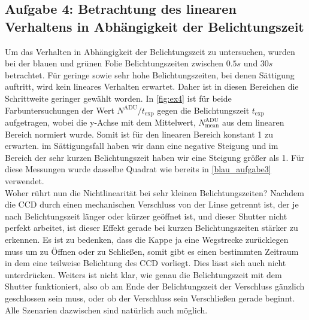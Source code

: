 \subsection{Aufgabe 4: Betrachtung des linearen Verhaltens in Abhängigkeit der Belichtungszeit}
Um das Verhalten in Abhängigkeit der Belichtungszeit zu untersuchen, wurden bei der blauen und grünen Folie Belichtungszeiten zwischen  $0.5 \unit{s}$ und $30 \unit{s}$ betrachtet. Für geringe sowie sehr hohe Belichtungszeiten, bei denen Sättigung auftritt, wird kein lineares Verhalten erwartet. Daher ist in diesen Bereichen die Schrittweite geringer gewählt worden. In \autoref{fig:ex4} ist für beide Farbuntersuchungen der Wert $N^\mathrm{ADU}/t_\mathrm{exp}$ gegen die Belichtungszeit $t_\mathrm{exp}$ aufgetragen, wobei die y-Achse mit dem Mittelwert, $N_\mathrm{mean}^\mathrm{ADU}$ aus dem linearen Bereich normiert wurde. Somit ist für den linearen Bereich  konstant 1 zu erwarten. im Sättigungsfall haben wir dann eine negative Steigung und im Bereich der sehr kurzen Belichtungszeit haben wir eine Steigung größer als 1. Für diese Messungen wurde dasselbe Quadrat wie bereits in \autoref{blau_aufgabe3} verwendet. \\

Woher rührt nun die Nichtlinearität bei sehr kleinen Belichtungszeiten? Nachdem die CCD durch einen mechanischen Verschluss von der Linse getrennt ist, der je nach Belichtungszeit länger oder kürzer geöffnet ist, und dieser Shutter nicht perfekt arbeitet, ist dieser Effekt gerade bei kurzen Belichtungszeiten stärker zu erkennen. Es ist zu bedenken, dass die Kappe ja eine Wegstrecke zurücklegen muss um zu Öffnen oder zu Schließen, somit gibt es einen bestimmten Zeitraum in dem eine teilweise Belichtung des CCD vorliegt. Dies lässt sich auch nicht unterdrücken. Weiters ist nicht klar, wie genau die Belichtungszeit mit dem Shutter funktioniert, also ob am Ende der Belichtungszeit der Verschluss gänzlich geschlossen sein muss, oder ob der Verschluss sein Verschließen gerade beginnt. Alle Szenarien dazwischen sind natürlich auch möglich.


